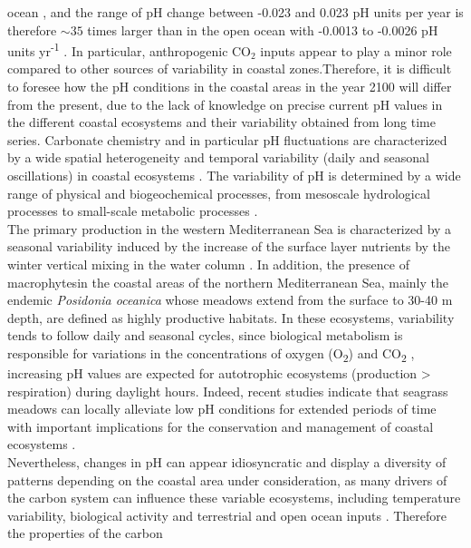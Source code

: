 ocean \cite{Borges2010}, and the range of pH change between -0.023 and 0.023 pH
units per year\cite{Carstensen2019} is therefore $\sim 35$ times larger than in
the open ocean with -0.0013 to -0.0026 pH units yr\textsuperscript{-1}
\cite{Bates2014}. In particular, anthropogenic CO$_2$ inputs appear to play a
minor role compared to other sources of variability in coastal
zones\cite{Hofmann2011}.Therefore, it is difficult to foresee how the pH
conditions in the coastal areas in the year 2100 will differ from the present,
due to the lack of knowledge on precise current pH values in the different
coastal ecosystems and their variability obtained from long time series.
Carbonate chemistry and in particular pH fluctuations are characterized by a
wide spatial heterogeneity and temporal variability (daily and seasonal
oscillations) in coastal ecosystems  \cite{Hofmann2011,Duarte2013,Mercado2011}.
The variability of pH is determined by a wide range of physical and
biogeochemical processes, from mesoscale hydrological processes to small-scale
metabolic processes \cite{Krause-Jensen2015}.\\
The primary production in the western Mediterranean Sea is characterized by
a seasonal variability induced by the increase of the surface layer nutrients
by the winter vertical mixing in the water column
\cite{goffredo2013mediterranean}. In addition, the presence of
macrophytes\cite{murphy2019world}in the coastal areas of the northern
Mediterranean Sea, mainly the endemic \emph{Posidonia oceanica} whose meadows
extend from the surface to 30-40 m depth, are defined as highly productive
habitats. In these ecosystems, variability tends to follow daily and seasonal
cycles, since biological metabolism is responsible for variations in the
concentrations of oxygen (O\textsubscript{2}) and CO\textsubscript{2}
\cite{Duarte2013,Hendriks2014}, increasing pH values are expected for
autotrophic ecosystems (production > respiration) during daylight hours.
Indeed, recent studies indicate that seagrass meadows can locally alleviate low
pH conditions for extended periods of time with important implications for the
conservation and management of coastal ecosystems  \cite{Ricart2021}.\\
Nevertheless, changes in pH can appear idiosyncratic and display a
diversity of patterns depending on the coastal area under consideration, as
many drivers of the carbon system can influence these variable ecosystems,
including temperature variability, biological activity and terrestrial and open
ocean inputs \cite{Carstensen2019}. Therefore the properties of the carbon
